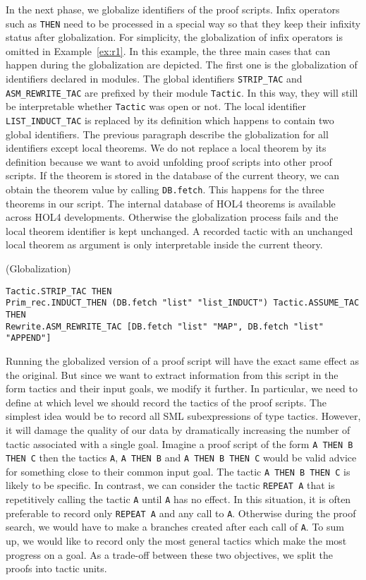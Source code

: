 \documentclass[runningheads,a4paper,draft]{svjour3}
\def\holfour{\textsf{HOL4}\xspace}
\def\sml{\textsf{SML}\xspace}
\begin{document}
In the next phase, we globalize identifiers of the proof scripts.
Infix operators such as \texttt{THEN} need to be processed in a special way so
that they keep their infixity status after globalization. For simplicity,
the
globalization of infix operators is omitted in Example~\ref{ex:r1}.
In this example, the three main cases that can happen during the globalization
are depicted. The first one is the globalization of identifiers declared in
modules. The global identifiers \texttt{STRIP\_TAC} and
\texttt{ASM\_REWRITE\_TAC} are prefixed by their module \texttt{Tactic}. In
this way, they will still be interpretable whether \texttt{Tactic} was open or
not. The local identifier \texttt{LIST\_INDUCT\_TAC} is replaced by its
definition which happens to contain two global identifiers.
The previous paragraph describe the globalization for all identifiers except
local theorems.  We do not replace a local
theorem by its definition because we want to avoid unfolding proof scripts into
other proof scripts.
If the theorem is stored in the database of the current theory, we
can obtain the theorem value by calling \texttt{DB.fetch}. This happens for the
three theorems in our script. The internal database of \holfour theorems is
available across \holfour developments.
Otherwise the globalization process fails and the local theorem identifier is
kept unchanged. A recorded tactic with an unchanged local theorem as argument
is only interpretable inside the current theory.

\begin{example}\label{ex:r1} (Globalization)
\begin{lstlisting}[language=SMLSmall]
Tactic.STRIP_TAC THEN
Prim_rec.INDUCT_THEN (DB.fetch "list" "list_INDUCT") Tactic.ASSUME_TAC THEN
Rewrite.ASM_REWRITE_TAC [DB.fetch "list" "MAP", DB.fetch "list" "APPEND"]
\end{lstlisting}
\end{example}

Running the globalized version of a proof script will have the exact same
effect as the original. But since we want to extract information from this
script in the form tactics and their input goals, we modify it further.
In particular, we need to define at which level we should record the tactics of
the proof scripts. The simplest idea would be to record all \sml subexpressions
of type tactics. However, it will damage the quality of our data by
dramatically increasing the number of tactic associated with a single goal.
Imagine a proof script of the form \texttt{A THEN B THEN C} then the tactics
\texttt{A}, \texttt{A THEN B} and \texttt{A THEN B THEN C} would be valid
advice for something close to their common input goal. The tactic
\texttt{A THEN B THEN C} is likely to be specific. In contrast, we can consider
the tactic \texttt{REPEAT A} that is repetitively calling the tactic \texttt{A}
until
\texttt{A} has no effect. In this situation, it is often preferable to record
only \texttt{REPEAT A} and any call to \texttt{A}. Otherwise during the
proof search, we would have to make a branches created after each call of
\texttt{A}.
To sum up, we would like to record only the most general tactics which
make the most progress on a goal. As a trade-off between these two objectives,
we split the proofs into tactic units.
\end{document}
